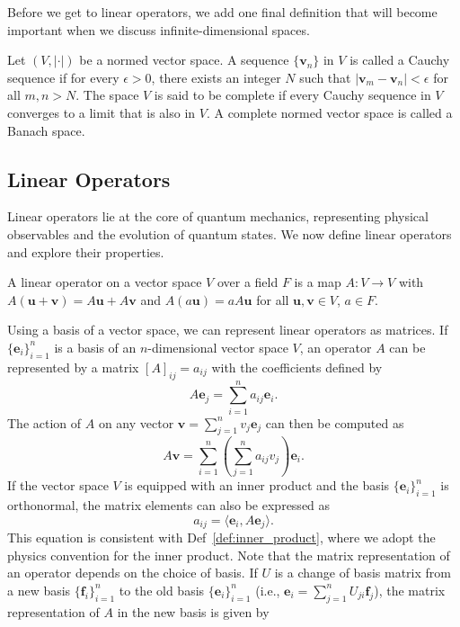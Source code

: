Before we get to linear operators, we add one final definition that will become important when we discuss infinite-dimensional spaces.
\begin{definition}
Let $(V,\lvert\cdot\rvert)$ be a normed vector space. A sequence $\lbrace\symbf{v}_n\rbrace$ in $V$ is called a Cauchy sequence if for every $\epsilon>0$, there exists an integer $N$ such that $\lvert\symbf{v}_m-\symbf{v}_n\rvert<\epsilon$ for all $m,n>N$. The space $V$ is said to be complete if every Cauchy sequence in $V$ converges to a limit that is also in $V$. A complete normed vector space is called a Banach space.
\end{definition}
\subsection{Linear Operators}\label{sec:linear_operators}
Linear operators lie at the core of quantum mechanics, representing physical observables and the evolution of quantum states. We now define linear operators and explore their properties.
\begin{definition}
A linear operator on a vector space $V$ over a field $F$ is a map $A:V\to V$ with $A(\symbf{u}+\symbf{v})=A\symbf{u}+A\symbf{v}$ and $A(a\symbf{u})=aA\symbf{u}$ for all $\symbf{u},\symbf{v}\in V$, $a\in F$.
\end{definition}
Using a basis of a vector space, we can represent linear operators as matrices. If $\lbrace\symbf{e}_i\rbrace_{i=1}^n$ is a basis of an $n$-dimensional vector space $V$, an operator $A$ can be represented by a matrix $[A]_{ij}=a_{ij}$ with the coefficients defined by
\begin{equation}
A\symbf{e}_j=\sum_{i=1}^n a_{ij}\symbf{e}_i.
\end{equation}
The action of $A$ on any vector $\symbf{v}=\sum_{j=1}^n v_j\symbf{e}_j$ can then be computed as
\begin{equation}
A\symbf{v}=\sum_{i=1}^n\left(\sum_{j=1}^n a_{ij}v_j\right)\symbf{e}_i.
\end{equation}
If the vector space $V$ is equipped with an inner product and the basis $\lbrace\symbf{e}_i\rbrace_{i=1}^n$ is orthonormal, the matrix elements can also be expressed as
\begin{equation}
a_{ij}=\langle\symbf{e}_i,A\symbf{e}_j\rangle.
\end{equation}
This equation is consistent with Def~\ref{def:inner_product}, where we adopt the physics convention for the inner product. Note that the matrix representation of an operator depends on the choice of basis. If $U$ is a change of basis matrix from a new basis $\lbrace\symbf{f}_i\rbrace_{i=1}^n$ to the old basis $\lbrace\symbf{e}_i\rbrace_{i=1}^n$ (i.e., $\symbf{e}_i=\sum_{j=1}^n U_{ji}\symbf{f}_j$), the matrix representation of $A$ in the new basis is given by
